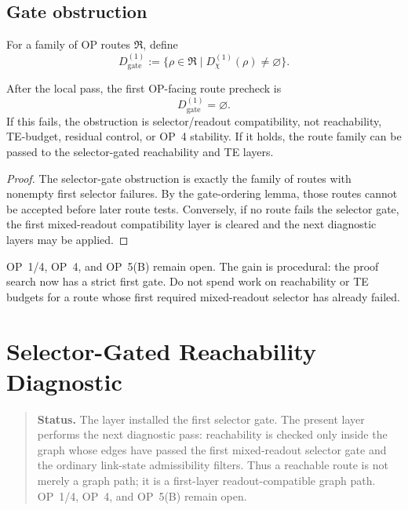 \subsection{Gate obstruction}
\label{subsec:v410r22-gate-obstruction}

\begin{definition}
\label{def:v410r22-selector-gate-obstruction}
For a family of OP routes \(\mathfrak R\), define
\[
 D_{\mathrm{gate}}^{(1)}
 :=
 \{\rho\in\mathfrak R\mid D_{\chi}^{(1)}(\rho)\neq\varnothing\}.
\]
\end{definition}

\begin{theorem}
\label{thm:v410r22-selector-to-route-reduction}
After the local pass, the first OP-facing route precheck is
\[
 D_{\mathrm{gate}}^{(1)}=\varnothing.
\]
If this fails, the obstruction is selector/readout compatibility, not
reachability, TE-budget, residual control, or OP~4 stability. If it holds, the
route family can be passed to the selector-gated reachability and TE layers.
\end{theorem}

\begin{proof}
The selector-gate obstruction is exactly the family of routes with nonempty
first selector failures. By the gate-ordering lemma, those routes cannot be
accepted before later route tests. Conversely, if no route fails the selector
gate, the first mixed-readout compatibility layer is cleared and the next
diagnostic layers may be applied.
\end{proof}

\begin{remark}
\label{rem:v410r22-op-status}
OP~1/4, OP~4, and OP~5(B) remain open. The gain is procedural: the proof search
now has a strict first gate. Do not spend work on reachability or TE budgets
for a route whose first required mixed-readout selector has already failed.
\end{remark}



\clearpage
\section{Selector-Gated Reachability Diagnostic}
\label{sec:v410r23-selector-gated-reachability}

\begin{quote}\small
\noindent\textbf{Status.}
The layer installed the first selector gate. The present layer performs
the next diagnostic pass: reachability is checked only inside the graph whose
edges have passed the first mixed-readout selector gate and the ordinary
link-state admissibility filters. Thus a reachable route is not merely a graph
path; it is a first-layer readout-compatible graph path. OP~1/4, OP~4, and
OP~5(B) remain open.
\end{quote}

